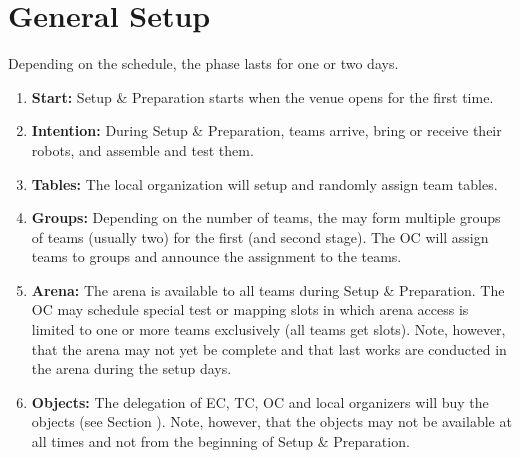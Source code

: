 \section{General Setup}
\label{sec:general_setup}
Depending on the schedule, the  phase lasts for one or two days.

\begin{enumerate}
	\item \textbf{Start:} Setup \& Preparation starts when the venue opens for the first time.
	\item \textbf{Intention:} During Setup \& Preparation, teams arrive, bring or receive their robots, and assemble and test them.
	\item \textbf{Tables:} The local organization will setup and randomly assign team tables.
	\item \textbf{Groups:} Depending on the number of teams, the  may form multiple groups of teams (usually two) for the first (and second stage). The OC will assign teams to groups and announce the assignment to the teams.
	\item \textbf{Arena:} The arena is available to all teams during Setup \& Preparation. The OC may schedule special test or mapping slots in which arena access is limited to one or more teams exclusively (all teams get slots). Note, however, that the arena may not yet be complete and that last works are conducted in the arena during the setup days.
	\item \textbf{Objects:} The delegation of EC, TC, OC and local organizers will buy the objects (see Section ). Note, however, that the objects may not be available at all times and not from the beginning of Setup \& Preparation.
\end{enumerate}

